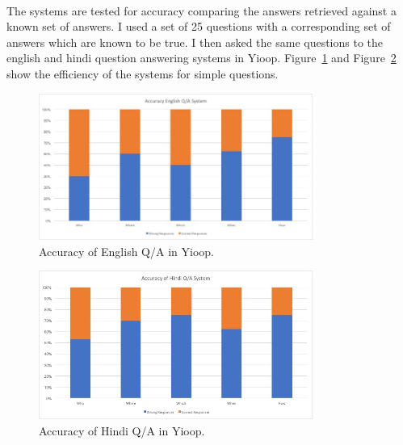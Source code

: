 \paragraph{}
The systems are tested for accuracy comparing the answers retrieved against a known set of answers. I used a set of 25 questions with a corresponding set of answers which are known to be true. I then asked the same questions to the english and hindi question answering systems in Yioop. Figure~\ref{fig:Accuracy_EnglishQA} and Figure~\ref{fig:Accuracy_HindiQA} show the efficiency of the systems for simple questions.

\begin{figure}[htb]
\centering
\includegraphics[width=0.8\textwidth]{images/Accuracy_EnglishQA.jpg}
\caption{Accuracy of English Q/A in Yioop.} 
\label{fig:Accuracy_EnglishQA}
\end{figure}

\begin{figure}[htb]
\centering
\includegraphics[width=0.8\textwidth]{images/Accuracy_HindiQA.jpg}
\caption{Accuracy of Hindi Q/A in Yioop.} 
\label{fig:Accuracy_HindiQA}
\end{figure}
